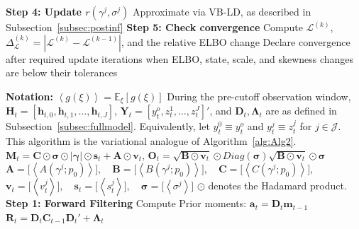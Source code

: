 \documentclass[APA,STIX1COL]{WileyNJD-v2}
\begin{document}
\begin{algorithm}
\begin{algorithmic}
        \State \textbf{Step 4: Update $r(\gamma^j, \sigma^j )$}
        \State Approximate via VB-LD, as described in Subsection~\ref{subsec:postinf}
    \EndFor
    \State \textbf{Step 5: Check convergence}
    \State Compute \(\mathcal{L}^{(k)}\), \(\Delta_{\mathcal{L}}^{(k)}=|\mathcal{L}^{(k)}-\mathcal{L}^{(k-1)}|\), and the relative ELBO change
    \State Declare convergence after required update iterations when ELBO,
    \Statex \hspace{\algorithmicindent} state, scale, and skewness changes are below their tolerances
\EndWhile

\end{algorithmic}
\end{algorithm}

\begin{algorithm}
\caption{VB-Filtering and VB-Smoothing}
\label{alg:Alg4}
\begin{algorithmic}

\State \textbf{Notation:}
\State $\left\langle g(\xi) \right\rangle = \mathbb{E}_\xi\left[ g(\xi) \right]$
\State  During the pre-cutoff observation window, \(\mathbf{H}_t = [\mathbf{h}_{t,0}, \mathbf{h}_{t,1}, \ldots, \mathbf{h}_{t,J}]\), \(\mathbf{Y}_t = [y_t^o, z_t^1, \ldots, z_t^J]'\), and \(\mathbf{D}_t, \boldsymbol{\Lambda}_t\) are as defined in Subsection~\ref{subsec:fullmodel}.
\State  Equivalently, let \(y_t^0 \equiv y_t^o\) and \(y_t^j \equiv z_t^j\) for \(j\in\mathcal{J}\). This algorithm is the variational analogue of Algorithm~\ref{alg:Alg2}.
\State $\mathbf{M}_t= \mathbf{C} \odot  \mathbf{\sigma} \odot | \mathbf{\gamma} | \odot \mathbf{s}_t + \mathbf{A} \odot \mathbf{v}_t$, \quad $\mathbf{O}_t= \sqrt{\mathbf{B} \odot \mathbf{v}_t} \odot Diag
(\mathbf{\sigma}) \sqrt{\mathbf{B} \odot \mathbf{v}_t} \odot \mathbf{\sigma}$
\State  \(
\mathbf{A} = \big[ \left\langle A(\gamma^j;p_0)  \right\rangle \big], \quad \mathbf{B} = \big[ \left\langle B(\gamma^j;p_0)  \right\rangle \big], \quad \mathbf{C} = \big[ \left\langle C(\gamma^j;p_0)  \right\rangle \big] \), 
\State \( \mathbf{v}_t = \big[ \left\langle v^j_t  \right\rangle \big], \quad  \mathbf{s}_t = \big[ \left\langle
s^j_t  \right\rangle \big] , \quad \mathbf{\sigma} = \big[ \left\langle \sigma^j  \right\rangle \big]
\)
\State \(\odot\) denotes the Hadamard product.
\State \textbf{Step 1: Forward Filtering}
    \State Compute Prior moments:
    \State $\mathbf{a}_t = \mathbf{D}_t \mathbf{m}_{t-1}$
    \State $\mathbf{R}_t = \mathbf{D}_t \mathbf{C}_{t-1} \mathbf{D}_t' +  \boldsymbol{\Lambda}_t$


\end{algorithmic}
\end{algorithm}
\end{document}
